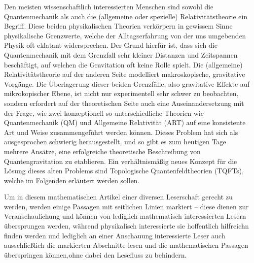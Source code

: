 Den meisten wissenschaftlich interessierten Menschen sind sowohl die
Quantenmechanik als auch die (allgemeine oder spezielle)
Relativitätstheorie ein Begriff. Diese beiden physikalischen Theorien
verkörpern in gewissem Sinne physikalische Grenzwerte, welche der
Alltagserfahrung von der uns umgebenden Physik oft eklatant
widersprechen. Der Grund hierfür ist, dass sich die Quantenmechanik
mit dem Grenzfall sehr kleiner Distanzen und Zeitspannen beschäftigt,
auf welchen die Gravitation oft keine Rolle spielt. Die (allgemeine)
Relativitätstheorie auf der anderen Seite modelliert makroskopische,
gravitative Vorgänge. Die Überlagerung dieser beiden Grenzfälle, also
gravitative Effekte auf mikrokopischer Ebene, ist nicht nur
experimentell sehr schwer zu beobachten, sondern erfordert auf der
theoretischen Seite auch eine Auseinandersetzung mit der Frage, wie
zwei konzeptionell so unterschiedliche Theorien wie Quantenmechanik
(QM) und Allgemeine Relativität (ART) auf eine konsistente Art und
Weise zusammengeführt werden können. Dieses Problem hat sich als
ausgesprochen schwierig herausgestellt, und so gibt es zum heutigen
Tage mehrere Ansätze, eine erfolgreiche theoretische Beschreibung von
Quantengravitation zu etablieren. Ein verhältnismäßig neues Konzept
für die Lösung dieses alten Problems sind Topologische
Quantenfeldtheorien (TQFTs), welche im Folgenden erläutert werden
sollen.

Um in diesem mathematischen Artikel einer diversen Leserschaft gerecht
zu werden, werden einige Passagen mit seitlichen Linien markiert --
diese dienen zur Veranschaulichung und können von lediglich
mathematisch interessierten Lesern übersprungen werden, während
physikalisch interessierte sie hoffentlich hilfreichn finden werden
und lediglich an einer Anschauung interessierte Leser auch
ausschließlich die markierten Abschnitte lesen und die mathematischen
Passagen überspringen können,ohne dabei den Lesefluss zu behindern.
